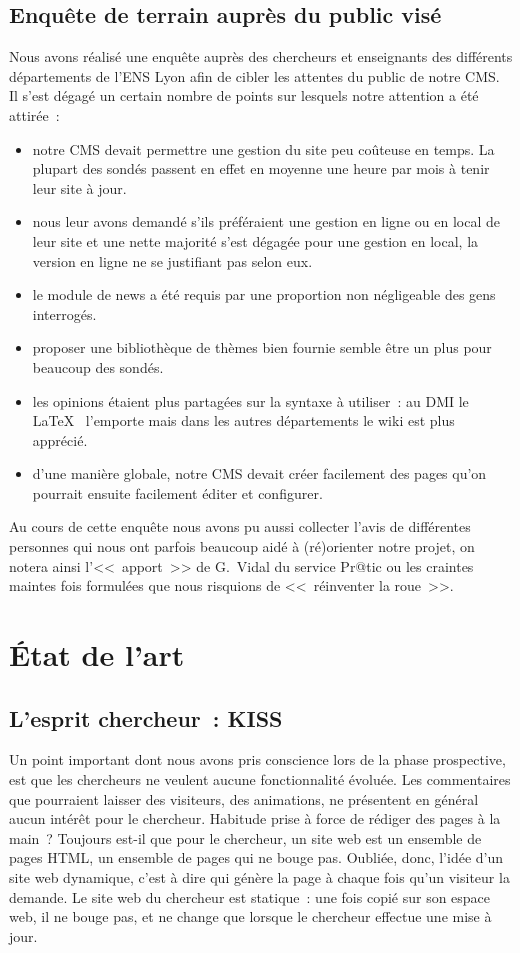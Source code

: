 \documentclass[final,11pt,a4paper,twoside,titlepage]{article}
\begin{document}
{  \subsection{Enquête de terrain auprès du public visé}
    Nous avons réalisé une enquête auprès des chercheurs et enseignants des
    différents départements de l'ENS Lyon afin de cibler les attentes du public de notre
    CMS. Il s'est dégagé un certain nombre de points sur lesquels notre
    attention a été attirée~:
    \begin{itemize}
    \item notre CMS devait permettre une gestion du site peu coûteuse en temps. La plupart des
    sondés passent en effet en moyenne une heure par mois à tenir leur site à jour.
    \item nous leur avons demandé s'ils préféraient une gestion en ligne ou en local de leur
    site et une nette majorité s'est dégagée pour une gestion en local, la version en
    ligne ne se justifiant pas selon eux.
    \item le module de news a été requis par une proportion non négligeable des gens interrogés.
    \item proposer une bibliothèque de thèmes bien fournie semble être un plus pour beaucoup
    des sondés.
    \item les opinions étaient plus partagées sur la syntaxe à utiliser~: au DMI le \LaTeX~ l'emporte
      mais dans les autres départements le wiki est plus apprécié.
    \item d'une manière globale, notre CMS devait créer facilement des pages qu'on pourrait
    ensuite facilement éditer et configurer.
    \end{itemize}
    Au cours de cette enquête nous avons pu aussi collecter l'avis de différentes
    personnes qui nous ont parfois beaucoup aidé à (ré)orienter notre projet, on notera
    ainsi l'<<~apport~>> de G.~Vidal du service Pr@tic ou les craintes maintes fois formulées que nous
    risquions de <<~réinventer la roue~>>.


  \section{État de l'art}
    \subsection{L'esprit chercheur~: KISS}
      Un point important dont nous avons pris conscience lors de la phase
      prospective, est que les chercheurs ne veulent aucune fonctionnalité
      évoluée. Les commentaires que pourraient laisser des visiteurs, des
      animations, ne présentent en général aucun intérêt pour le chercheur.
      Habitude prise à force de rédiger des pages à la main~? Toujours est-il
      que pour le chercheur, un site web est un ensemble de pages HTML, un
      ensemble de pages qui ne bouge pas. Oubliée, donc, l'idée d'un site web
      dynamique, c'est à dire qui génère la page à chaque fois qu'un visiteur la
      demande. Le site
      web du chercheur est statique~: une fois copié sur son espace web, il ne
      bouge pas, et ne change que lorsque le chercheur effectue une mise à jour.

}
\end{document}
